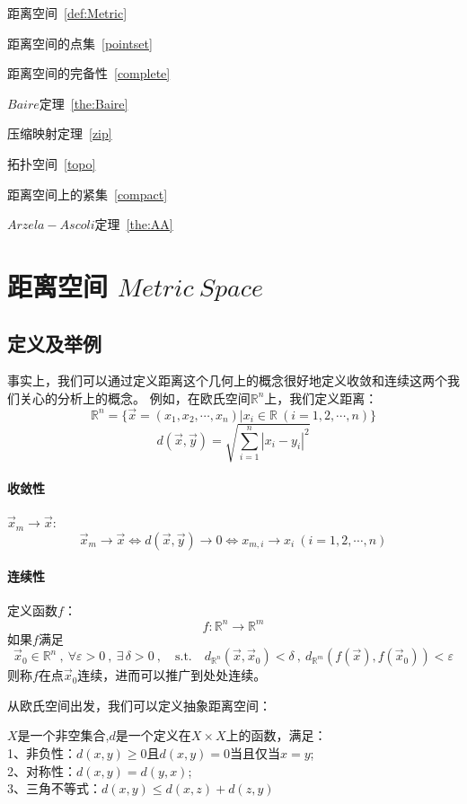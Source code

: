 \begin{introduction}
    \item 距离空间~\ref{def:Metric}
    \item 距离空间的点集~\ref{pointset}
    \item 距离空间的完备性~\ref{complete}
    \item $Baire$定理~\ref{the:Baire}
    \item 压缩映射定理~\ref{zip}
    \item 拓扑空间~\ref{topo}
    \item 距离空间上的紧集~\ref{compact}
    \item $Arzela-Ascoli$定理~\ref{the:AA}
  \end{introduction}
\section{距离空间 $Metric \ Space$}
\subsection{定义及举例}
事实上，我们可以通过定义距离这个几何上的概念很好地定义收敛和连续这两个我们关心的分析上的概念。
例如，在欧氏空间$\mathbb{R}^n$上，我们定义距离：
\[\mathbb{R}^n=\{\overrightarrow{x}=(x_1,x_2,\cdots,x_n)|x_i \in \mathbb{R} \ (i=1,2,\cdots,n)\}\]
\[d(\overrightarrow{x},\overrightarrow{y})=\sqrt{\sum_{i=1}^n\left|x_i-y_i\right|^2}\]
\paragraph*{收敛性} \quad $\overrightarrow{x}_m \rightarrow \overrightarrow{x}$:
\[\overrightarrow{x}_m \rightarrow \overrightarrow{x} \Leftrightarrow d(\overrightarrow{x},\overrightarrow{y}) \rightarrow 0 \Leftrightarrow x_{m,i} \rightarrow x_i \ (i=1,2,\cdots,n)\]
\paragraph*{连续性} \quad 定义函数$f$：
\[f:\mathbb{R}^n \rightarrow \mathbb{R}^m\]
如果$f$满足
\[\overrightarrow{x}_0 \in \mathbb{R}^n\ , \ \forall \varepsilon >0 \ , \ \exists \, \delta >0 \ , \quad \text{s.t.} \quad d_{\mathbb{R}^n}(\overrightarrow{x},\overrightarrow{x}_0)<\delta \ , \ d_{\mathbb{R}^m}(f(\overrightarrow{x}),f(\overrightarrow{x}_0))<\varepsilon\]
则称$f$在点$\overrightarrow{x}_0$连续，进而可以推广到处处连续。

从欧氏空间出发，我们可以定义抽象距离空间：
\begin{definition}[抽象距离空间] \label{def:Metric}
    $X$是一个非空集合,$d$是一个定义在$X \times X$上的函数，满足：\\
    1、非负性：$d(x,y) \geq 0$且$d(x,y)=0$当且仅当$x=y$;\\
    2、对称性：$d(x,y)=d(y,x)$;\\
    3、三角不等式：$d(x,y) \leq d(x,z)+d(z,y)$
\end{definition}

